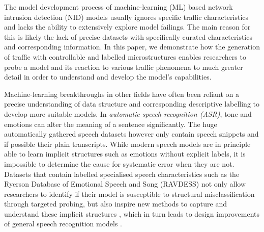\documentclass[conference]{IEEEtran}
\begin{document}
The model development process of machine-learning (ML) based network intrusion detection (NID) models usually ignores specific traffic characteristics and lacks the ability to extensively explore model failings. The main reason for this is likely the lack of precise datasets with specifically curated characteristics and corresponding information. In this paper, we demonstrate how the generation of traffic with controllable and labelled microstructures enables researchers to probe a model and its reaction to various traffic phenomena to much greater detail in order to understand and develop the model's capabilities.

Machine-learning breakthroughs in other fields have often been reliant on a precise understanding of data structure and corresponding descriptive labelling to develop more suitable models.
In \textit{automatic speech recognition (ASR)}, tone and emotions can alter the meaning of a sentence significantly. The huge automatically gathered speech datasets however only contain speech snippets and if possible their plain transcripts. While modern speech models are in principle able to learn implicit structures such as emotions without explicit labels, it is impossible to determine the cause for systematic error when they are not. Datasets that contain labelled specialised speech characteristics such as the Ryerson Database of Emotional Speech and Song (RAVDESS) \cite{livingstone2018ryerson} not only allow researchers to identify if their model is susceptible to structural misclassification through targeted probing, but also inspire new methods to capture and understand these implicit structures \cite{haque2019audio}, which in turn leads to design improvements of general speech recognition models \cite{kamper2020multilingual}.


\end{document}
